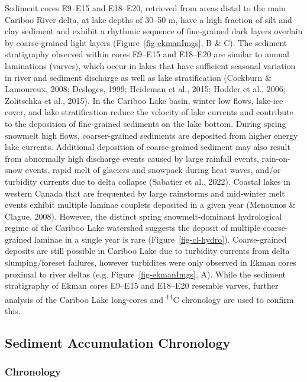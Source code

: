 \documentclass[
  letterpaper,
  DIV=11,
  numbers=noendperiod]{scrartcl}
\begin{document}
Sediment cores E9--E15 and E18--E20, retrieved from areas distal to the
main Cariboo River delta, at lake depths of 30--50 m, have a high
fraction of silt and clay sediment and exhibit a rhythmic sequence of
fine-grained dark layers overlain by coarse-grained light layers
(Figure~\ref{fig-ekmanImgs}, B \& C). The sediment stratigraphy observed
within cores E9--E15 and E18--E20 are similar to annual laminations
(varves), which occur in lakes that have sufficient seasonal variation
in river and sediment discharge as well as lake stratification (Cockburn
\& Lamoureux, 2008; Desloges, 1999; Heideman et al., 2015; Hodder et
al., 2006; Zolitschka et al., 2015). In the Cariboo Lake basin, winter
low flows, lake-ice cover, and lake stratification reduce the velocity
of lake currents and contribute to the deposition of fine-grained
sediments on the lake bottom. During spring snowmelt high flows,
coarser-grained sediments are deposited from higher energy lake
currents. Additional deposition of coarse-grained sediment may also
result from abnormally high discharge events caused by large rainfall
events, rain-on-snow events, rapid melt of glaciers and snowpack during
heat waves, and/or turbidity currents due to delta collapse (Sabatier et
al., 2022). Coastal lakes in western Canada that are frequented by large
rainstorms and mid-winter melt events exhibit multiple laminae couplets
deposited in a given year (Menounos \& Clague, 2008). However, the
distinct spring snowmelt-dominant hydrological regime of the Cariboo
Lake watershed suggests the deposit of multiple coarse-grained laminae
in a single year is rare (Figure~\ref{fig-cl-hydro}). Coarse-grained
deposits are still possible in Cariboo Lake due to turbidity currents
from delta slumping/foreset failures, however turbidites were only
observed in Ekman cores proximal to river deltas (e.g.
Figure~\ref{fig-ekmanImgs}, A). While the sediment stratigraphy of Ekman
cores E9--E15 and E18--E20 resemble varves, further analysis of the
Cariboo Lake long-cores and \textsuperscript{14}C chronology are used to
confirm this.

\hypertarget{sediment-accumulation-chronology}{%
\subsection{Sediment Accumulation
Chronology}\label{sediment-accumulation-chronology}}

\hypertarget{chronology}{%
\subsubsection{Chronology}\label{chronology}}
\end{document}
